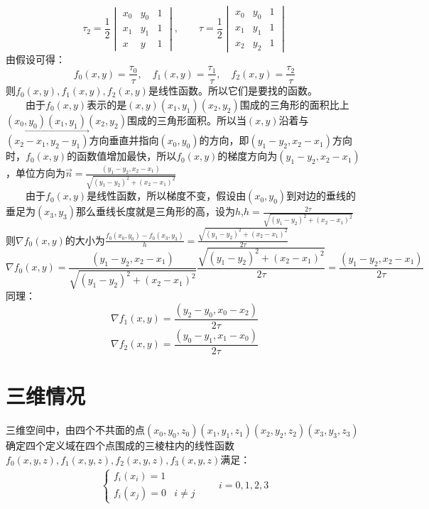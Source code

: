 \documentclass[12pt,a4paper]{article}
\begin{document}
$$
\tau_2=\frac{1}{2}\begin{vmatrix}
x_0&y_0&1\\
x_1&y_1&1\\
x&y&1
\end{vmatrix},\qquad
\tau=\frac{1}{2}\begin{vmatrix}
x_0&y_0&1\\
x_1&y_1&1\\
x_2&y_2&1
\end{vmatrix}
$$
由假设可得：
$$
f_0(x,y)=\frac{\tau_0}{\tau},\quad f_1(x,y)=\frac{\tau_1}{\tau},\quad f_2(x,y)=\frac{\tau_2}{\tau}
$$
则$f_0(x,y),f_1(x,y),f_2(x,y)$是线性函数。所以它们是要找的函数。\\
$\qquad$由于$f_0(x,y)$表示的是${(x,y)(x_1,y_1)(x_2,y_2)}$围成的三角形的面积比上${(x_0,y_0)(x_1,y_1)(x_2,y_2)}$围成的三角形面积。所以当$(x,y)$沿着与$\vec{(x_2-x_1,y_2-y_1)}$方向垂直并指向$(x_0,y_0)$的方向，即$(y_1-y_2,x_2-x_1)$方向时，$f_0(x,y)$的函数值增加最快，所以$f_0(x,y)$的梯度方向为$(y_1-y_2,x_2-x_1)$，单位方向为$\vec{n}=\frac{(y_1-y_2,x_2-x_1)}{\sqrt{(y_1-y_2)^2+(x_2-x_1)^2}}$\\
$\qquad$由于$f_0(x,y)$是线性函数，所以梯度不变，假设由$(x_0,y_0)$到对边的垂线的垂足为$(x_3,y_3)$那么垂线长度就是三角形的高，设为$h$,$h=\frac{2\tau}{\sqrt{(y_1-y_2)^2+(x_2-x_1)^2}}$
则$\nabla f_0(x,y)$的大小为$\frac{f_0(x_0,y_0)-f_0(x_3,y_3)}{h}=\frac{\sqrt{(y_1-y_2)^2+(x_2-x_1)^2}}{2\tau}$
$$
\nabla f_0(x,y)=\frac{(y_1-y_2,x_2-x_1)}{\sqrt{(y_1-y_2)^2+(x_2-x_1)^2}}\frac{\sqrt{(y_1-y_2)^2+(x_2-x_1)^2}}{2\tau}=\frac{(y_1-y_2,x_2-x_1)}{2\tau}
$$
同理：
$$
\nabla f_1(x,y)=\frac{(y_2-y_0,x_0-x_2)}{2\tau}
$$
$$
\nabla f_2(x,y)=\frac{(y_0-y_1,x_1-x_0)}{2\tau}
$$
\section{三维情况}
三维空间中，由四个不共面的点$(x_0,y_0,z_0)(x_1,y_1,z_1)(x_2,y_2,z_2)(x_3,y_3,z_3)$确定四个定义域在四个点围成的三棱柱内的线性函数$f_0(x,y,z),f_1(x,y,z),f_2(x,y,z),f_3(x,y,z)$满足：
\begin{align}
\begin{cases}
f_i(x_i)=1&{}\\
f_i(x_j)=0&i\ne j
\end{cases}
\qquad i=0,1,2,3
\end{align}
\end{document}
